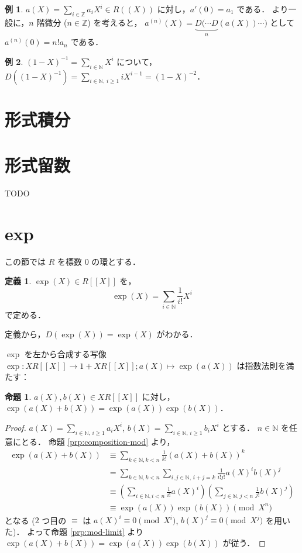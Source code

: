 \documentclass{jsarticle}
\newcommand{\N}{\mathbb{N}}
\newcommand{\Z}{\mathbb{Z}}
\newcommand{\longto}{\longrightarrow}
\theoremstyle{definition}
\newtheorem*{Dfn}{定義}
\newtheorem*{Exm}{例}
\newtheorem{Prp}{命題}
\newenvironment{dfn}{\vspace{1ex}\begin{screen}\begin{Dfn}}{\end{Dfn}\end{screen}\vspace{1ex}}
\newenvironment{exm}{\begin{leftbar}\begin{Exm}}{\end{Exm}\end{leftbar}}
\newenvironment{prp}{\vspace{1ex}\begin{screen}\begin{Prp}}{\end{Prp}\end{screen}}
\newenvironment{prf}{\begin{leftbar}\begin{proof}}{\end{proof}\end{leftbar}}
\begin{document}
\begin{exm}
  $a(X) = \sum_{i\in\Z} a_i X^i \in R((X))$ に対し，$a'(0) = a_1$ である．
  より一般に，$n$ 階微分 ($n \in \Z$) を考えると，
  $a^{(n)}(X) = \underbrace{D(\cdots D}_n (a(X)) \cdots)$ として $a^{(n)}(0) = n! a_n$ である．
\end{exm}

\begin{exm}
  $(1 - X)^{-1} = \sum_{i\in\N} X^i$ について，
  $D((1 - X)^{-1}) = \sum_{i\in\N,\,i\ge 1} i X^{i-1} = (1 - X)^{-2}$．
\end{exm}


\section{形式積分}


\section{形式留数}
TODO


\section{exp}この節では $R$ を標数 $0$ の環とする．

\begin{dfn}
  $\exp(X) \in R[[X]]$ を，
  \[
    \exp(X) = \sum_{i\in\N} \frac{1}{i!} X^i
  \]
  で定める．
\end{dfn}

定義から，$D(\exp(X)) = \exp(X)$ がわかる．

$\exp$ を左から合成する写像 $\exp\colon X R[[X]] \longto 1 + X R[[X]]; a(X) \longmapsto \exp(a(X))$ は指数法則を満たす：

\begin{prp}
  $a(X), b(X) \in X R[[X]]$ に対し，$\exp(a(X) + b(X)) = \exp(a(X)) \exp(b(X))$．
\end{prp}
\begin{prf}
  $a(X) = \sum_{i\in\N,\,i\ge 1} a_i X^i$, $b(X) = \sum_{i\in\N,\,i\ge 1} b_i X^i$ とする．
  $n \in \N$ を任意にとる．
  命題 \ref{prp:composition-mod} より，
  \begin{align*}
    \exp(a(X) + b(X))
    &\equiv \sum_{k\in\N,k<n} \frac{1}{k!} (a(X) + b(X))^k \\
    &= \sum_{k\in\N,k<n} \sum_{i,j\in\N,\,i+j=k} \frac{1}{i! j!} a(X)^i b(X)^j \\
    &\equiv \left(\sum_{i\in\N,i<n} \frac{1}{i!} a(X)^i\right) \left(\sum_{j\in\N,j<n} \frac{1}{j!} b(X)^j\right) \\
    &\equiv \exp(a(X)) \exp(b(X))
    \pmod{X^n}
  \end{align*}
  となる ($2$ つ目の $\equiv$ は $a(X)^i \equiv 0 \pmod{X^i}$, $b(X)^j \equiv 0 \pmod{X^j}$ を用いた)．
  よって命題 \ref{prp:mod-limit} より $\exp(a(X) + b(X)) = \exp(a(X)) \exp(b(X))$ が従う．
\end{prf}
\end{document}
